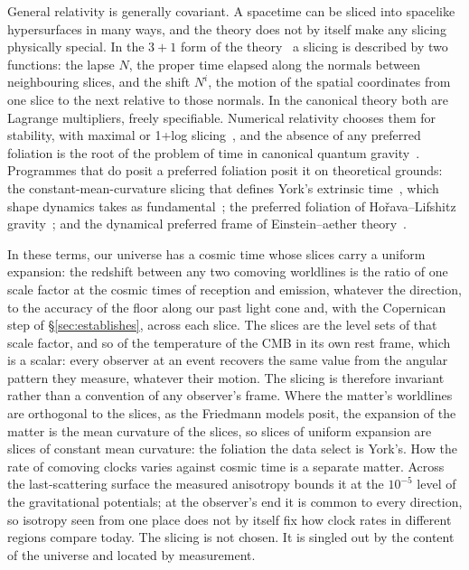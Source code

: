 \documentclass[11pt,a4paper]{article}
\begin{document}
General relativity is generally covariant. A spacetime can be sliced into spacelike hypersurfaces in many ways, and the theory does not by itself make any slicing physically special. In the $3{+}1$ form of the theory~\cite{ADM1962} a slicing is described by two functions: the lapse $N$, the proper time elapsed along the normals between neighbouring slices, and the shift $N^{i}$, the motion of the spatial coordinates from one slice to the next relative to those normals. In the canonical theory both are Lagrange multipliers, freely specifiable. Numerical relativity chooses them for stability, with maximal or 1+log slicing~\cite{BaumgarteShapiro2010}, and the absence of any preferred foliation is the root of the problem of time in canonical quantum gravity~\cite{Kuchar1992, Isham1993}. Programmes that do posit a preferred foliation posit it on theoretical grounds: the constant-mean-curvature slicing that defines York's extrinsic time~\cite{York1972}, which shape dynamics takes as fundamental~\cite{Gomes2011}; the preferred foliation of Ho\v{r}ava--Lifshitz gravity~\cite{Horava2009}; and the dynamical preferred frame of Einstein--aether theory~\cite{Jacobson2001}.

In these terms, our universe has a cosmic time whose slices carry a uniform expansion: the redshift between any two comoving worldlines is the ratio of one scale factor at the cosmic times of reception and emission, whatever the direction, to the accuracy of the floor along our past light cone and, with the Copernican step of \S\ref{sec:establishes}, across each slice. The slices are the level sets of that scale factor, and so of the temperature of the CMB in its own rest frame, which is a scalar: every observer at an event recovers the same value from the angular pattern they measure, whatever their motion. The slicing is therefore invariant rather than a convention of any observer's frame. Where the matter's worldlines are orthogonal to the slices, as the Friedmann models posit, the expansion of the matter is the mean curvature of the slices, so slices of uniform expansion are slices of constant mean curvature: the foliation the data select is York's. How the rate of comoving clocks varies against cosmic time is a separate matter. Across the last-scattering surface the measured anisotropy bounds it at the $10^{-5}$ level of the gravitational potentials; at the observer's end it is common to every direction, so isotropy seen from one place does not by itself fix how clock rates in different regions compare today. The slicing is not chosen. It is singled out by the content of the universe and located by measurement.
\end{document}
